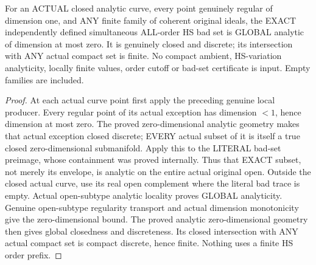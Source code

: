 \begin{theorem}
\label{hir:original-smooth-curve-exact-global-all-hs-variation-analytic}
\leanok
For an ACTUAL closed analytic curve, every point genuinely regular of
dimension one, and ANY finite family of coherent original ideals, the
EXACT independently defined simultaneous ALL-order HS bad set is GLOBAL
analytic of dimension at most zero. It is genuinely closed and discrete;
its intersection with ANY actual compact set is finite. No compact ambient,
HS-variation analyticity, locally finite values, order cutoff or bad-set
certificate is input. Empty families are included.
\end{theorem}
\begin{proof}
At each actual curve point first apply the preceding genuine local
producer. Every regular point of its actual exception has dimension
$<1$, hence dimension at most zero. The proved zero-dimensional analytic
geometry makes that actual exception closed discrete; EVERY actual
subset of it is itself a true closed zero-dimensional submanifold.
Apply this to the LITERAL bad-set preimage, whose containment was proved
internally. Thus that EXACT subset, not merely its envelope, is analytic
on the entire actual original open. Outside the closed actual curve, use
its real open complement where the literal bad trace is empty. Actual
open-subtype analytic locality proves GLOBAL analyticity. Genuine
open-subtype regularity transport and actual dimension monotonicity give
the zero-dimensional bound. The proved analytic zero-dimensional geometry
then gives global closedness and discreteness. Its closed intersection
with ANY actual compact set is compact discrete, hence finite. Nothing
uses a finite HS order prefix.
\end{proof}

